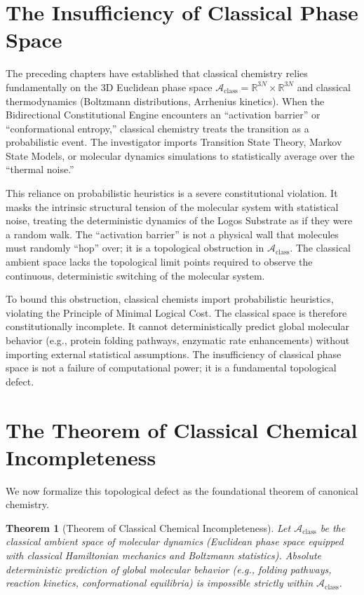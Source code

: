 \documentclass[11pt,openany]{extbook}
\theoremstyle{plain}
\newtheorem{theorem}{Theorem}[chapter]
\theoremstyle{definition}
\begin{document}
\section{The Insufficiency of Classical Phase Space}

The preceding chapters have established that classical chemistry relies fundamentally on the 3D Euclidean phase space $\mathcal{A}_{\text{class}} = \mathbb{R}^{3N} \times \mathbb{R}^{3N}$ and classical thermodynamics (Boltzmann distributions, Arrhenius kinetics). When the Bidirectional Constitutional Engine encounters an ``activation barrier'' or ``conformational entropy,'' classical chemistry treats the transition as a probabilistic event. The investigator imports Transition State Theory, Markov State Models, or molecular dynamics simulations to statistically average over the ``thermal noise.''

This reliance on probabilistic heuristics is a severe constitutional violation. It masks the intrinsic structural tension of the molecular system with statistical noise, treating the deterministic dynamics of the Logos Substrate as if they were a random walk. The ``activation barrier'' is not a physical wall that molecules must randomly ``hop'' over; it is a topological obstruction in $\mathcal{A}_{\text{class}}$. The classical ambient space lacks the topological limit points required to observe the continuous, deterministic switching of the molecular system.

To bound this obstruction, classical chemists import probabilistic heuristics, violating the Principle of Minimal Logical Cost. The classical space is therefore constitutionally incomplete. It cannot deterministically predict global molecular behavior (e.g., protein folding pathways, enzymatic rate enhancements) without importing external statistical assumptions. The insufficiency of classical phase space is not a failure of computational power; it is a fundamental topological defect.

\section{The Theorem of Classical Chemical Incompleteness}

We now formalize this topological defect as the foundational theorem of canonical chemistry.

\begin{theorem}[Theorem of Classical Chemical Incompleteness]
Let $\mathcal{A}_{\text{class}}$ be the classical ambient space of molecular dynamics (Euclidean phase space equipped with classical Hamiltonian mechanics and Boltzmann statistics). Absolute deterministic prediction of global molecular behavior (e.g., folding pathways, reaction kinetics, conformational equilibria) is impossible strictly within $\mathcal{A}_{\text{class}}$.
\end{theorem}
\end{document}
